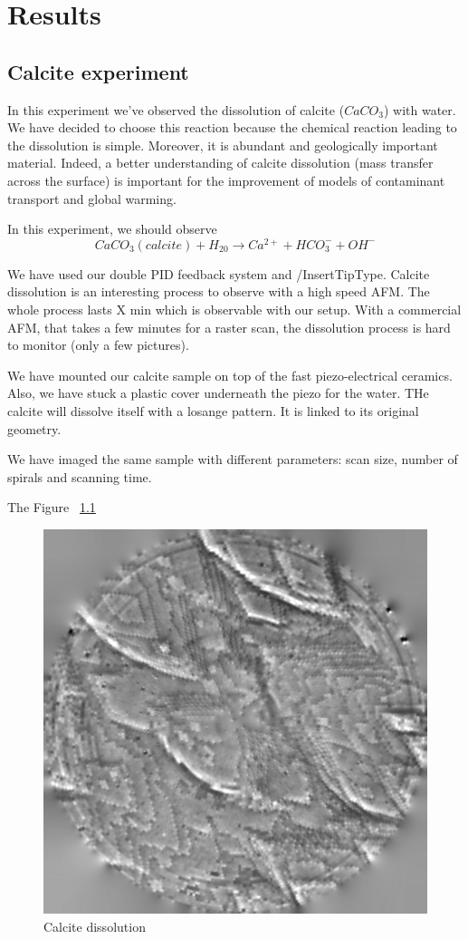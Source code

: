 \chapter{Results}


\section{Calcite experiment}

In this experiment we've observed the dissolution of calcite ($CaCO_3$) with water. We have decided to choose this reaction because the chemical reaction leading to the dissolution is simple. Moreover, it is abundant and geologically important material.\cite{hillner1992atomic} Indeed, a better understanding of calcite dissolution (mass transfer across the surface) is important for the improvement of models of contaminant transport and global warming. \cite{liang1996dissolution}

In this experiment, we should observe \cite{Hillner19921387}
\begin{equation}\label{calcite}
CaCO_3(calcite) + H_20 \rightarrow Ca^{2+} + HCO_3^- + OH^- 
\end{equation}

We have used our double PID feedback system and /InsertTipType. Calcite dissolution is an interesting process to observe with a high speed AFM. The whole process lasts X min which is observable with our setup. With a commercial AFM, that takes a few minutes for a raster scan, the dissolution process is hard to monitor (only a few pictures).

We have mounted our calcite sample on top of the fast piezo-electrical ceramics. Also, we have stuck a plastic cover underneath the piezo for the water. THe calcite will dissolve itself with a losange pattern. It is linked to its original geometry.

We have imaged the same sample with different parameters: scan size, number of spirals and scanning time.

The Figure ~\ref{Calcite dissolution} 
\begin{figure}[H]
  \centering
  \includegraphics[scale=0.5]{images/006_X10s50l10m_MOv2_17.png}
    \caption{Calcite dissolution}
  \label{Calcite dissolution}
\end{figure}


